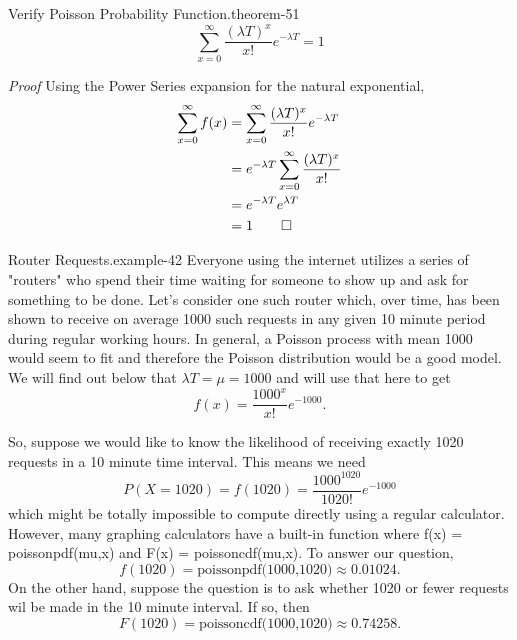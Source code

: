 \documentclass[10pt,]{book}
\makeatletter
\renewcommand*{\proofname}{Proof}
\renewenvironment{proof}[1][\proofname]{\par
  \pushQED{\qed}%
  \normalfont \topsep6\p@\@plus6\p@\relax
  \trivlist
  \item\relax
    {\itshape
    #1\@addpunct{.}}\hspace\labelsep\ignorespaces
}{%
  \popQED\endtrivlist\@endpefalse
}
\numberwithin{equation}{section}
\makeatother
\begin{document}
%
\par
\hypertarget{p-1031}{}%
\begin{theorem}{Verify Poisson Probability Function.}{}{theorem-51}%
\hypertarget{p-1032}{}%
%
\begin{equation*}
\sum_{x=0}^{\infty} \frac{(\lambda T)^x}{x!} e^{-\lambda T} = 1
\end{equation*}
%
\end{theorem}
\begin{proof}\hypertarget{proof-53}{}
\hypertarget{p-1033}{}%
Using the Power Series expansion for the natural exponential,%
\begin{align*}
\sum_{x=0}^{\infty} f(x) & = \sum_{x=0}^{\infty} \frac{(\lambda T)^x}{x!} e^{-\lambda T} \\
& = e^{-\lambda T} \sum_{x=0}^{\infty} \frac{(\lambda T)^x}{x!} \\
& = e^{-\lambda T} e^{\lambda T}  \\
& = 1\qedhere
\end{align*}
%
\end{proof}
%
\par
\hypertarget{p-1034}{}%
\begin{example}{Router Requests.}{example-42}%
\hypertarget{p-1035}{}%
Everyone using the internet utilizes a series of "routers" who spend their time waiting for someone to show up and ask for something to be done. Let's consider one such router which, over time, has been shown to receive on average 1000 such requests in any given 10 minute period during regular working hours. In general, a Poisson process with mean 1000 would seem to fit and therefore the Poisson distribution would be a good model. We will find out below that \(\lambda T = \mu = 1000\) and will use that here to get%
\begin{equation*}
f(x) = \frac{1000^x}{x!} e^{-1000}.
\end{equation*}
%
\par
\hypertarget{p-1036}{}%
So, suppose we would like to know the likelihood of receiving exactly 1020 requests in a 10 minute time interval.  This means we need%
\begin{equation*}
P(X = 1020) = f(1020) = \frac{1000^{1020}}{1020!} e^{-1000}
\end{equation*}
which might be totally impossible to compute directly using a regular calculator. However, many graphing calculators have a built-in function where f(x) = poissonpdf(mu,x) and F(x) = poissoncdf(mu,x). To answer our question,%
\begin{equation*}
f(1020) = \text{poissonpdf(1000,1020)} \approx 0.01024.
\end{equation*}
On the other hand, suppose the question is to ask whether 1020 or fewer requests wil be made in the 10 minute interval. If so, then%
\begin{equation*}
F(1020) = \text{poissoncdf(1000,1020)} \approx 0.74258.
\end{equation*}
%
\end{example}
\end{document}
